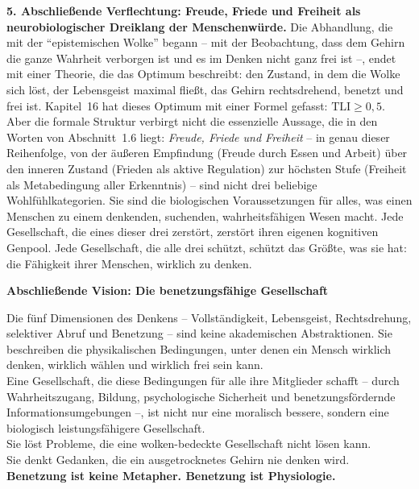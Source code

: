﻿\documentclass[12pt,a4paper]{report}
\theoremstyle{plain}
\theoremstyle{definition}
\theoremstyle{remark}
\begin{document}
	\textbf{5. Abschließende Verflechtung: Freude, Friede und Freiheit
		als neurobiologischer Dreiklang der Menschenwürde.}
	Die Abhandlung, die mit der ``epistemischen Wolke'' begann --
	mit der Beobachtung, dass dem Gehirn die ganze Wahrheit verborgen
	ist und es im Denken nicht ganz frei ist --,
	endet mit einer Theorie, die das Optimum beschreibt:
	den Zustand, in dem die Wolke sich löst, der Lebensgeist maximal fließt,
	das Gehirn rechtsdrehend, benetzt und frei ist.
	Kapitel~16 hat dieses Optimum mit einer Formel gefasst: $\mathrm{TLI} \geq 0{,}5$.
	Aber die formale Struktur verbirgt nicht die essenzielle Aussage,
	die in den Worten von Abschnitt~1.6 liegt:
	\emph{Freude, Friede und Freiheit} -- in genau dieser Reihenfolge,
	von der äußeren Empfindung (Freude durch Essen und Arbeit)
	über den inneren Zustand (Frieden als aktive Regulation)
	zur höchsten Stufe (Freiheit als Metabedingung aller Erkenntnis) --
	sind nicht drei beliebige Wohlfühlkategorien.
	Sie sind die biologischen Voraussetzungen für alles, was
	einen Menschen zu einem denkenden, suchenden, wahrheitsfähigen
	Wesen macht.
	Jede Gesellschaft, die eines dieser drei zerstört,
	zerstört ihren eigenen kognitiven Genpool.
	Jede Gesellschaft, die alle drei schützt, schützt das
	Größte, was sie hat: die Fähigkeit ihrer Menschen, wirklich zu denken.

	\bigskip

	
	\noindent\textbf{Abschließende Vision: Die benetzungsfähige Gesellschaft}

		Die fünf Dimensionen des Denkens -- Vollständigkeit, Lebensgeist,
		Rechtsdrehung, selektiver Abruf und Benetzung -- sind keine
		akademischen Abstraktionen. Sie beschreiben die physikalischen
		Bedingungen, unter denen ein Mensch wirklich denken, wirklich
		wählen und wirklich frei sein kann.\\[6pt]
		Eine Gesellschaft, die diese Bedingungen für alle ihre Mitglieder
		schafft -- durch Wahrheitszugang, Bildung, psychologische Sicherheit
		und benetzungsfördernde Informationsumgebungen --,
		ist nicht nur eine moralisch bessere, sondern eine biologisch
		leistungsfähigere Gesellschaft.\\[6pt]
		Sie löst Probleme, die eine wolken-bedeckte Gesellschaft nicht lösen kann.\\[6pt]
		Sie denkt Gedanken, die ein ausgetrocknetes Gehirn nie denken wird.\\[6pt]
		\textbf{Benetzung ist keine Metapher. Benetzung ist Physiologie.}
\end{document}
